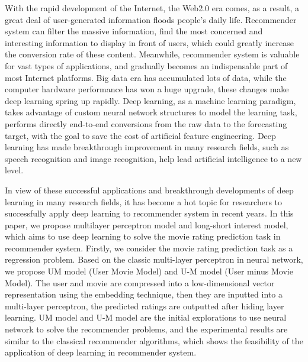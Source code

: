 \begin{eabstract}
With the rapid development of the Internet, the Web2.0 era comes, as a result,
a great deal of user-generated information floods people's daily life.
Recommender system can filter the massive information, 
find the most concerned and interesting information to display in front of users,
which could greatly increase the conversion rate of these content.
Meanwhile, recommender system is valuable for vast types of applications,
and gradually becomes an indispensable part of most Internet platforms.
Big data era has accumulated lots of data, while the computer hardware performance has won a huge upgrade,
these changes make deep learning spring up rapidly. Deep learning, as a machine learning paradigm,
takes advantage of custom neural network structures to model the learning task,
performs directly end-to-end conversions from the raw data to the forecasting target,
with the goal to save the cost of artificial feature engineering.
Deep learning has made breakthrough improvement in many research fields,
such as speech recognition and image recognition, help lead artificial intelligence to a new level.

In view of these successful applications and breakthrough developments of deep learning in many research fields,
it has become a hot topic for researchers to successfully apply deep learning to recommender system in recent years.
In this paper, we propose multilayer perceptron model and long-short interest model,
which aims to use deep learning to solve the movie rating prediction task in recommender system.
Firstly, we consider the movie rating prediction task as a regression problem.
Based on the classic multi-layer perceptron in neural network,
we propose UM model (User Movie Model) and U-M model (User minus Movie Model).
The user and movie are compressed into a low-dimensional vector representation using the embedding technique,
then they are inputted into a multi-layer perceptron, the predicted ratings are outputted after hiding layer learning.
UM model and U-M model are the initial explorations to use neural network to solve the recommender problems,
and the experimental results are similar to the classical recommender algorithms,
which shows the feasibility of the application of deep learning in recommender system.


\end{eabstract}
